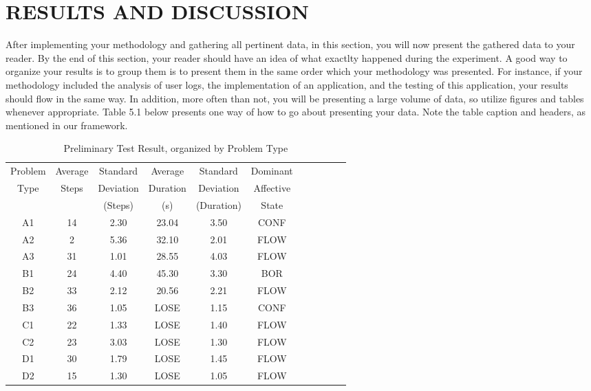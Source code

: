 \chapter{RESULTS AND DISCUSSION}
After implementing your methodology and gathering all pertinent data, in this section, you will now present the gathered data to your reader. By the end of this section, your reader should have an idea of what exactlty happened during the experiment. 
A good way to organize your results is to group them is to present them in the same order which your methodology was presented. For instance, if your methodology included the analysis of user logs, the implementation of an application, and the testing of this application, your results should flow in the same way. In addition, more often than not, you will be presenting a large volume of data, so utilize figures and tables whenever appropriate. Table 5.1 below presents one way of how to go about presenting your data. Note the table caption and headers, as mentioned in our framework.


\begin{table}[t]
\centering
\caption {Preliminary Test Result, organized by Problem Type}
\label{tab:acc_lit} 
\begin{tabular}{ c  c  c  c  c  c  c  c  c  c  c }
\hline
Problem	&Average 	&Standard 	&Average 		&Standard		&Dominant\\
Type  &Steps   &Deviation   &Duration   &Deviation   &Affective\\
  &   &(Steps)   &(s)   &(Duration)   &State\\ \hline

A1  &14   &2.30   &23.04   &3.50   &CONF\\
A2  &2   &5.36   &32.10   &2.01   &FLOW\\
A3  &31   &1.01   &28.55   &4.03   &FLOW\\
B1  &24   &4.40   &45.30   &3.30   &BOR\\
B2  &33   &2.12   &20.56   &2.21   &FLOW\\
B3  &36   &1.05   &LOSE   &1.15   &CONF\\
C1  &22   &1.33   &LOSE   &1.40   &FLOW\\
C2  &23   &3.03   &LOSE   &1.30   &FLOW\\
D1  &30   &1.79   &LOSE   &1.45   &FLOW\\
D2  &15   &1.30   &LOSE   &1.05   &FLOW\\ \hline
\end{tabular}
\end{table}



